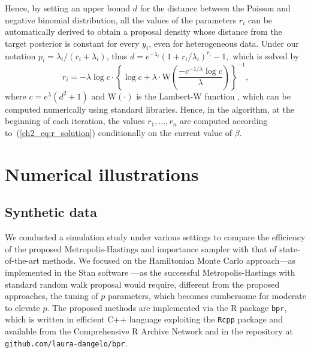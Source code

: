 Hence, by setting an upper bound $d$ for the distance between the Poisson and negative binomial distribution, all the values of the parameters $r_i$ can be automatically derived to obtain a proposal density whose distance from the target posterior is constant for every $y_i$, even for heterogeneous data. Under our notation $p_i=\lambda_i/(r_i+\lambda_i)$, thus
$d = e^{-\lambda_i} ( 1 + r_i/\lambda_i)^{r_i} - 1,$
which is solved by
\begin{equation}
r_i = - \lambda \log c \cdot
\left\{ \log c + \lambda \cdot\mathrm{W}\left( \frac{-c^{-1/\lambda} \log c}{\lambda} \right) \right\}^{-1},
\label{ch2_eq:r_solution}
\end{equation}
where $c=e^{\lambda}(d^2+1)$ and $\mathrm{W}(\cdot)$ is the Lambert-W function \parencite{W}, which can be computed numerically using standard libraries. 
%
Hence, in the algorithm, at the beginning of each iteration, the values $r_1, \dots, r_n$ are computed according to~(\ref{ch2_eq:r_solution}) conditionally on the current value of $\beta$. %


\section{Numerical illustrations}
\label{ch2_sec:illustr}

\subsection{Synthetic data}
\label{ch2_sec:sim}

We conducted a simulation study under various settings to compare the efficiency of the proposed Metropolis-Hastings and importance sampler with that of state-of-the-art methods. We focused on the Hamiltonian Monte Carlo approach---as implemented in the Stan software \parencite{stan}---as the successful Metropolis-Hastings with standard random walk proposal would require, different from the proposed approaches, the tuning of $p$ parameters, which becomes cumbersome for moderate to elevate $p$. The proposed methods are implemented via the R package \texttt{bpr}, %
which is written in efficient C++ language exploiting the \texttt{Rcpp} package \parencite{RCPP} and available from the Comprehensive R Archive Network \parencite{bpr} and in the repository
at \texttt{github.com/laura-dangelo/bpr}.

